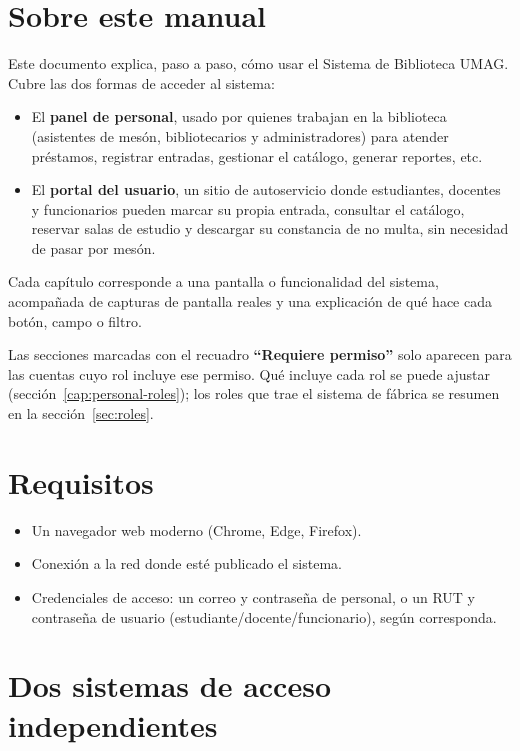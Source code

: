 \documentclass[11pt,a4paper]{report}
\begin{document}
\section{Sobre este manual}

Este documento explica, paso a paso, cómo usar el Sistema de Biblioteca UMAG.
Cubre las dos formas de acceder al sistema:

\begin{itemize}
  \item El \textbf{panel de personal}, usado por quienes trabajan en la
  biblioteca (asistentes de mesón, bibliotecarios y administradores) para
  atender préstamos, registrar entradas, gestionar el catálogo, generar
  reportes, etc.
  \item El \textbf{portal del usuario}, un sitio de autoservicio donde
  estudiantes, docentes y funcionarios pueden marcar su propia entrada,
  consultar el catálogo, reservar salas de estudio y descargar su
  constancia de no multa, sin necesidad de pasar por mesón.
\end{itemize}

Cada capítulo corresponde a una pantalla o funcionalidad del sistema,
acompañada de capturas de pantalla reales y una explicación de qué hace
cada botón, campo o filtro.

\begin{nota}
Las secciones marcadas con el recuadro \textbf{``Requiere permiso''} solo
aparecen para las cuentas cuyo rol incluye ese permiso. Qué incluye cada
rol se puede ajustar (sección~\ref{cap:personal-roles}); los roles que
trae el sistema de fábrica se resumen en la
sección~\ref{sec:roles}.
\end{nota}

\section{Requisitos}

\begin{itemize}
  \item Un navegador web moderno (Chrome, Edge, Firefox).
  \item Conexión a la red donde esté publicado el sistema.
  \item Credenciales de acceso: un correo y contraseña de personal, o un
  RUT y contraseña de usuario (estudiante/docente/funcionario), según
  corresponda.
\end{itemize}

\section{Dos sistemas de acceso independientes}
\end{document}
